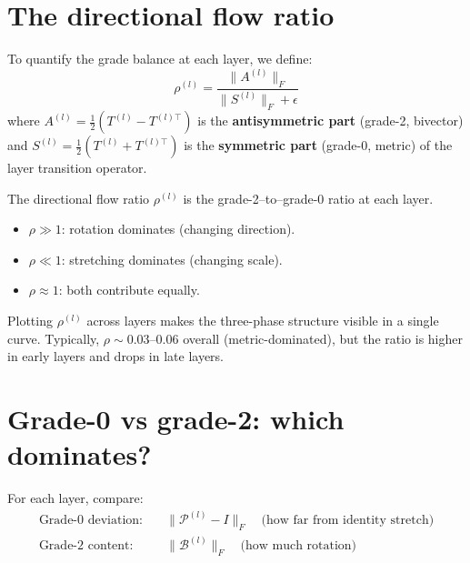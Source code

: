 \documentclass[11pt, twoside, openright]{memoir}
\newcommand{\bivec}[1]{\mathcal{B}^{(#1)}}  %
\newcommand{\metric}[1]{\mathcal{P}^{(#1)}} %
\numberwithin{equation}{chapter}
\begin{document}
\section{The directional flow ratio}

To quantify the grade balance at each layer, we define:
\begin{equation}
  \rho^{(l)} = \frac{\|A^{(l)}\|_F}{\|S^{(l)}\|_F + \epsilon}
\end{equation}
where $A^{(l)} = \frac{1}{2}(T^{(l)} - T^{(l)\top})$ is the
\textbf{antisymmetric part} (grade-2, bivector) and
$S^{(l)} = \frac{1}{2}(T^{(l)} + T^{(l)\top})$ is the
\textbf{symmetric part} (grade-0, metric) of the layer transition
operator.

\begin{keyidea}
The directional flow ratio $\rho^{(l)}$ is the grade-2--to--grade-0
ratio at each layer.
\begin{itemize}[nosep]
\item $\rho \gg 1$: rotation dominates (changing direction).
\item $\rho \ll 1$: stretching dominates (changing scale).
\item $\rho \approx 1$: both contribute equally.
\end{itemize}
Plotting $\rho^{(l)}$ across layers makes the three-phase
structure visible in a single curve.  Typically,
$\rho \sim 0.03$--$0.06$ overall (metric-dominated), but the
ratio is higher in early layers and drops in late layers.
\end{keyidea}

\section{Grade-0 vs grade-2: which dominates?}

For each layer, compare:
\begin{align}
  \text{Grade-0 deviation:} &\quad \|\metric{l} - I\|_F
    \quad\text{(how far from identity stretch)} \\
  \text{Grade-2 content:} &\quad \|\bivec{l}\|_F
    \quad\text{(how much rotation)}
\end{align}
\end{document}
